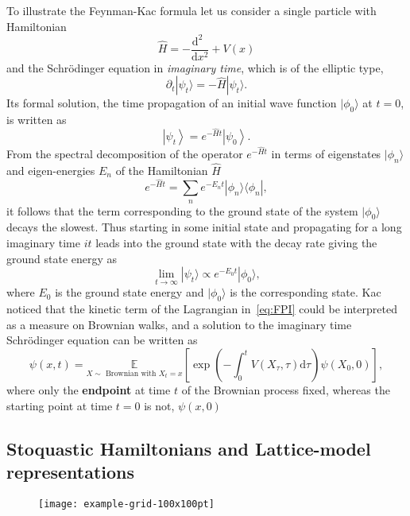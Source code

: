 To illustrate the Feynman-Kac formula let us consider a single particle with Hamiltonian
\begin{equation}
	\hat{H} = -\frac{\mathrm{d}^2~~}{\mathrm{d}x^2} + V(x)
\end{equation}
and the Schr\" odinger equation in \textit{imaginary time}, which is of the elliptic type, 
\begin{equation}
	\partial_t | \psi_t \rangle = - \hat{H} | \psi_t \rangle.
\end{equation}
Its formal solution, the time propagation of an initial wave function $|\phi_0\rangle$ at $t=0$, is written as
\begin{equation}
	\left| \psi_{t} \right\rangle = e^{-\hat{H} t}\left|\psi_{0}\right\rangle. 
\end{equation}
From the spectral decomposition of the operator $e^{-\hat{H} t}$ in terms of eigenstates $|\phi_n\rangle$ and eigen-energies $E_n$ of the Hamiltonian $\hat{H}$
\begin{equation}
	e^{-\hat{H} t}=\sum_{n} e^{-E_{n} t}|\phi_n\rangle\langle\phi_n|, 
\end{equation}
it follows that the term corresponding to the ground state of the system $|\phi_0\rangle$ decays the slowest. Thus starting in some initial state and propagating for a long imaginary time $it$ leads into the ground state with the decay rate giving the ground state energy as
\begin{equation}
	\lim_{t \rightarrow \infty} | \psi_t \rangle \propto e^{-E_0 t} | \phi_0 \rangle,
\end{equation} 
where $E_0$ is the ground state energy and $|\phi_0\rangle$ is the corresponding state. Kac noticed that the kinetic term of the Lagrangian in~\eqref{eq:FPI} could be interpreted as a measure on Brownian walks, and a solution to the imaginary time Schr\" odinger equation can be written as
\begin{equation}
	\psi(x, t)=\underset{X \sim \text { Brownian with } X_{t}=x}{\mathbb{E}}
	\left[\exp \left(-\int_{0}^{t}  V\left(X_{\tau}, \tau \right) \mathrm{d}\tau \right) \psi\left(X_{0}, 0\right)\right],
\end{equation}
where only the \textbf{endpoint} at time $t$ of the Brownian process fixed, whereas the starting point at time $t=0$ is not, $\psi (x, 0)$ 


\subsection{Stoquastic Hamiltonians and Lattice-model representations}
\label{subsec:fk-latt}
\begin{figure}[h]
	\centering
	\texttt{[image: example-grid-100x100pt]}
\end{figure}

